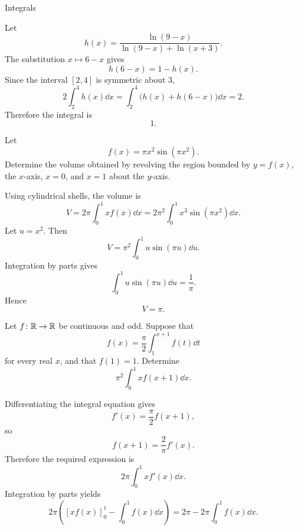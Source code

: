 \begin{expectedproblemgroup}{Integrals}
        \begin{expectedsubsolution}
            Let
            \[
                h(x)
                =
                \frac{\ln(9-x)}{
                    \ln(9-x)+\ln(x+3)
                }.
            \]
            The substitution $x\mapsto6-x$ gives
            \[
                h(6-x)=1-h(x).
            \]
            Since the interval $[2,4]$ is symmetric about $3$,
            \[
                2\int_2^4h(x)\dd x
                =
                \int_2^4\bigl(h(x)+h(6-x)\bigr)\dd x
                =2.
            \]
            Therefore the integral is
            \[
                \boxed{1}.
            \]
        \end{expectedsubsolution}

        \begin{expectedsubproblem}
            Let
            \[
                f(x)=\pi x^2\sin(\pi x^2).
            \]
            Determine the volume obtained by revolving the region bounded by
            $y=f(x)$, the $x$-axis, $x=0$, and $x=1$ about the $y$-axis.
        \end{expectedsubproblem}

        \begin{expectedsubsolution}
            Using cylindrical shells, the volume is
            \[
                V
                =
                2\pi\int_0^1x f(x)\dd x
                =
                2\pi^2\int_0^1x^3\sin(\pi x^2)\dd x.
            \]
            Let $u=x^2$. Then
            \[
                V
                =
                \pi^2\int_0^1u\sin(\pi u)\dd u.
            \]
            Integration by parts gives
            \[
                \int_0^1u\sin(\pi u)\dd u=\frac1\pi.
            \]
            Hence
            \[
                \boxed{V=\pi}.
            \]
        \end{expectedsubsolution}

        \begin{expectedsubproblem}[2014 CSAT]
            Let $f\colon\mathbb{R}\to\mathbb{R}$ be continuous and odd. Suppose that
            \[
                f(x)
                =
                \frac{\pi}{2}
                \int_1^{x+1}f(t)\dd t
            \]
            for every real $x$, and that $f(1)=1$. Determine
            \[
                \pi^2\int_0^1x f(x+1)\dd x.
            \]
        \end{expectedsubproblem}

        \begin{expectedsubsolution}
            Differentiating the integral equation gives
            \[
                f'(x)=\frac{\pi}{2}f(x+1),
            \]
            so
            \[
                f(x+1)=\frac{2}{\pi}f'(x).
            \]
            Therefore the required expression is
            \[
                2\pi\int_0^1x f'(x)\dd x.
            \]
            Integration by parts yields
            \[
                2\pi\left(
                    [xf(x)]_0^1-\int_0^1f(x)\dd x
                \right)
                =
                2\pi-2\pi\int_0^1f(x)\dd x.
            \]


\end{expectedsubsolution}
\end{expectedproblemgroup}
